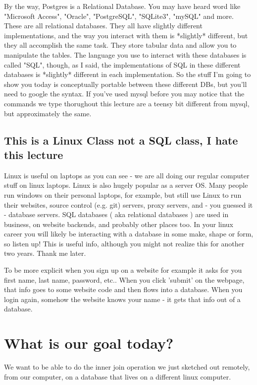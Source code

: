 \documentclass[12pt,a4paper]{article}
\begin{document}
By the way, Postgres is a Relational Database. You may have heard word like "Microsoft Access", "Oracle", "PostgreSQL", "SQLite3", "mySQL" and more. These are all relational databases. They all have slightly different implementations, and the way you interact with them is *slightly* different, but they all accomplish the same task. They store tabular data and allow you to manipulate the tables. The language you use to interact with these databases is called "SQL", though, as I said, the implementations of SQL in these different databases is *slightly* different in each implementation. So the stuff I'm going to show you today is conceptually portable between these different DBs, but you'll need to google the syntax. If you've used mysql before you may notice that the commands we type thorughout this lecture are a teensy bit different from mysql, but approximately the same.

\subsection{This is a Linux Class not a SQL class, I hate this lecture}
Linux is useful on laptops as you can see - we are all doing our regular computer stuff on linux laptops. Linux is also hugely popular as a server OS. Many people run windows on their personal laptops, for example, but still use Linux to run their websites, source control (e.g. git) servers, proxy servers, and - you guessed it - database servers. SQL databases ( aka relational databases ) are used in business, on website backends, and probably other places too. In your linux career you will likely be interacting with a database in some make, shape or form, so listen up! This is useful info, although you might not realize this for another two years. Thank me later.


To be more explicit when you sign up on a website for example it asks for you first name, last name, password, etc.. When you click 'submit' on the webpage, that info goes to some website code and then flows into a database. When you login again, somehow the website knows your name - it gets that info out of a database. 

\section{What is our goal today?}
We want to be able to do the inner join operation we just sketched out remotely, from our computer, on a database that lives on a different linux computer.
\end{document}
